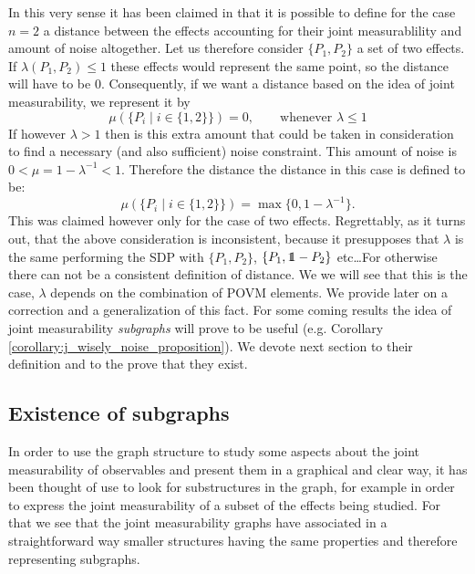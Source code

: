 \documentclass[10pt, a4paper]{amsart}
\begin{document}
In this very sense it has been claimed in \cite{wolfgarcia} that it is possible to define for the case $n = 2$ a distance between the effects accounting for their joint measurablility and amount of noise altogether. Let us therefore consider $\{P_{1}, P_{2}\}$ a set of two effects. If $\lambda(P_{1},P_{2}) \leq 1$ these effects would represent the same point, so the distance will have to be $0$. Consequently, if we want a distance based on the idea of joint measurability, we represent it by 
$$
\mu (\{P_{i}\mid i\in\{ 1,2 \}\}) = 0, \qquad \mbox{whenever } \lambda \leq 1
$$
If however $\lambda >1$ then is this extra amount that could be taken in consideration to find a necessary (and also sufficient) noise constraint. This amount of noise is  $0< \mu = 1-\lambda^{-1} <1$. Therefore the distance the distance in this case is defined to be:
$$
\mu (\{P_{i}\mid i\in \{ 1,2 \}\}) = \max \{0 , 1-\lambda^{-1}\}.
$$
This was claimed however only for the case of two effects. Regrettably, as it turns out, that the above consideration is inconsistent, because it presupposes that $\lambda$ is the same performing the SDP with $\{P_{1},P_{2}\}$, $\{P_{1}, \bbone - P_{2}\}$ etc\ldots For otherwise there can not be a consistent definition of distance.  We we will see that this is the case, $\lambda$ depends on the combination of POVM elements.  We provide later on a correction and a generalization of this fact.  For some coming results the idea of joint measurability \textit{subgraphs} will prove to be useful (e.g. Corollary \ref{corollary:j_wisely_noise_proposition}). We devote next section to their definition and to the prove that they exist. 































\newpage
\subsection{Existence of subgraphs}
In order to use the graph structure to study some aspects about the joint measurability of observables and present them in a graphical and clear way, it has been thought of use to look for substructures in the graph, for example in order  to express the joint measurability of a subset of the effects being studied. For that we see that the joint measurability graphs have associated in a straightforward way smaller structures having the same properties and therefore representing subgraphs. 
\end{document}
